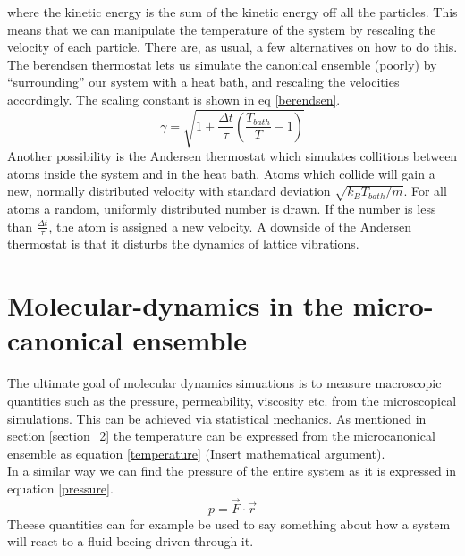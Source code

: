 \documentclass[a4paper,english, 10pt, twoside]{article}
\begin{document}
where the kinetic energy is the sum of the kinetic energy off all the particles. This means that we can 
manipulate the temperature of the system by rescaling the velocity of each particle. There are, as usual, 
a few alternatives on how to do this. The berendsen thermostat lets us simulate the canonical ensemble (poorly) by 
``surrounding'' our system with a heat bath, and rescaling the velocities accordingly. The scaling constant 
is shown in eq \ref{berendsen}.
\begin{equation}\label{berendsen}
 \gamma = \sqrt{1+\frac{\Delta t}{\tau}\left(\frac{T_{bath}}{T}-1\right)}
\end{equation}
Another possibility is the Andersen thermostat which simulates collitions between atoms inside the system and in 
the heat bath. Atoms which collide will gain a new, normally distributed velocity with standard deviation 
$\sqrt{k_B T_{bath}/m}$. For all atoms a random, uniformly distributed number is drawn. If the number is less than 
$\frac{\Delta t}{\tau}$, the atom is assigned a new velocity. A downside of the Andersen thermostat is that 
it disturbs the dynamics of lattice vibrations.

\section{Molecular-dynamics in the micro-canonical ensemble}
The ultimate goal of molecular dynamics simuations is to measure macroscopic quantities such as the pressure, 
permeability, viscosity etc. from the microscopical simulations. This can be achieved via statistical mechanics. 
As mentioned in section \ref{section_2} the temperature can be expressed from the microcanonical ensemble as 
equation \ref{temperature} (Insert mathematical argument).\\
In a similar way we can find the pressure of the entire system as it is expressed in equation \ref{pressure}.
\begin{equation}\label{pressure}
p = \vec{F}\cdot\vec{r} 
\end{equation}
Theese quantities can for example be used to say something about how a system will react to a fluid beeing 
driven through it.
\end{document}
